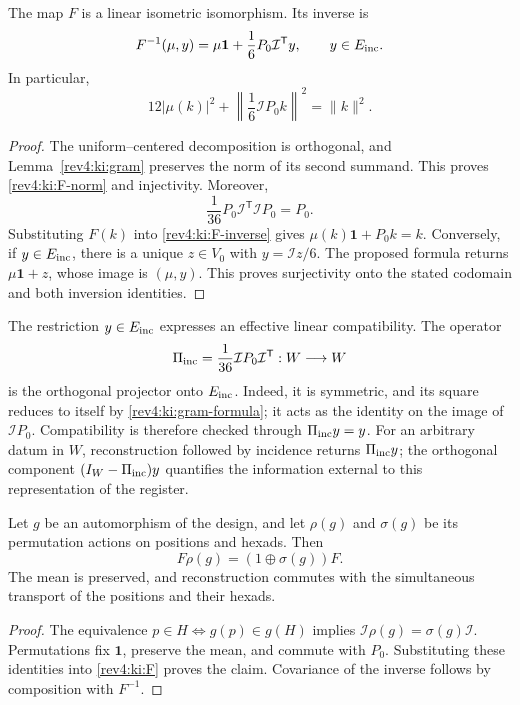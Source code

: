 \begin{theorem}
\label{rev4:ki:full-isometry}
The map \(F\) is a linear isometric isomorphism. Its inverse is
\begin{equation}
 F^{-1}(\mu,y)=\mu\mathbf1+
                  \frac16P_0\mathcal I^{\mathsf T}y,
 \qquad y\in E_{\rm inc}.
 \label{rev4:ki:F-inverse}
\end{equation}
In particular,
\begin{equation}
 12|\mu(k)|^2+
 \left\|\frac16\mathcal I P_0k\right\|^2=\|k\|^2.
 \label{rev4:ki:F-norm}
\end{equation}
\end{theorem}
\begin{proof}
The uniform--centered decomposition is orthogonal, and
Lemma~\ref{rev4:ki:gram} preserves the norm of its second summand.
This proves \eqref{rev4:ki:F-norm} and injectivity. Moreover,
\[
 \frac1{36}P_0\mathcal I^{\mathsf T}\mathcal I P_0=P_0.
\]
Substituting \(F(k)\) into \eqref{rev4:ki:F-inverse} gives
\(\mu(k)\mathbf1+P_0k=k\). Conversely, if
\(y\in E_{\rm inc}\), there is a unique \(z\in V_0\) with
\(y=\mathcal I z/6\). The proposed formula returns
\(\mu\mathbf1+z\), whose image is \((\mu,y)\). This proves
surjectivity onto the stated codomain and both inversion identities.
\end{proof}

The restriction \(y\in E_{\rm inc}\) expresses an effective linear
compatibility. The operator
\begin{equation}
 \Pi_{\rm inc}=\frac1{36}\mathcal I P_0
                         \mathcal I^{\mathsf T}:W\longrightarrow W
 \label{rev4:ki:inc-projector}
\end{equation}
is the orthogonal projector onto \(E_{\rm inc}\). Indeed, it is
symmetric, and its square reduces to itself by
\eqref{rev4:ki:gram-formula}; it acts as the identity on the image
of \(\mathcal I P_0\). Compatibility is therefore checked through
\(\Pi_{\rm inc}y=y\). For an arbitrary datum in \(W\),
reconstruction followed by incidence returns \(\Pi_{\rm inc}y\);
the orthogonal component \((I_W-\Pi_{\rm inc})y\) quantifies the
information external to this representation of the register.

\begin{proposition}
\label{rev4:ki:equivariance}
Let \(g\) be an automorphism of the design, and let \(\rho(g)\)
and \(\sigma(g)\) be its permutation actions on positions and
hexads. Then
\[
 F\rho(g)=(1\oplus\sigma(g))F.
\]
The mean is preserved, and reconstruction commutes with the
simultaneous transport of the positions and their hexads.
\end{proposition}
\begin{proof}
The equivalence \(p\in H\Longleftrightarrow g(p)\in g(H)\)
implies \(\mathcal I\rho(g)=\sigma(g)\mathcal I\).
Permutations fix \(\mathbf1\), preserve the mean, and commute with
\(P_0\). Substituting these identities into \eqref{rev4:ki:F}
proves the claim. Covariance of the inverse follows by composition
with \(F^{-1}\).
\end{proof}


